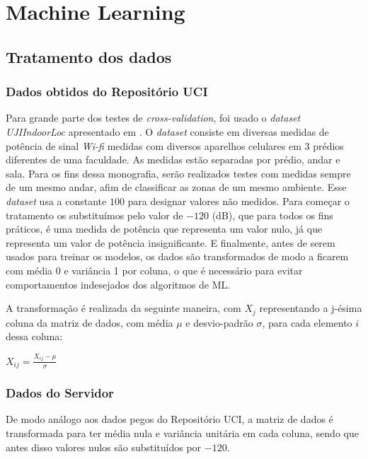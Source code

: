 \chapter{Machine Learning}\label{chp:ml}


\section{Tratamento dos dados}\label{sec:data1}

\subsection{Dados obtidos do Repositório UCI}
	Para grande parte dos testes de \textit{cross-validation}, foi usado o \textit{dataset}  \textit{UJIIndoorLoc} apresentado em \cite{uji}. O \textit{dataset} consiste em diversas medidas de potência de sinal \textit{Wi-fi} medidas com diversos aparelhos celulares em 3 prédios diferentes de uma faculdade. As medidas estão separadas por prédio, andar e sala. Para os fins dessa monografia, serão realizados testes com medidas sempre de um mesmo andar, afim de classificar as zonas de um mesmo ambiente.  Esse  \textit{dataset} usa a constante $100$ para designar valores não medidos. Para começar o tratamento os substituímos pelo valor de $-120$ (dB), que para todos os fins práticos, é uma medida de potência que representa um valor nulo, já que representa um valor de potência insignificante. E finalmente, antes de serem usados para treinar os modelos, os dados são transformados de modo a ficarem com média 0 e variância 1 por coluna, o que é necessário para evitar comportamentos indesejados dos algoritmos de ML.
	
A transformação é realizada da seguinte maneira, com $X_j$ representando a j-ésima coluna da matriz de dados, com média $\mu$ e desvio-padrão $\sigma$, para cada elemento $i$ dessa coluna:

\begin{center}
$X_{ij}=\frac{X_{ij}-\mu}{\sigma}$	
\end{center}

\subsection{Dados do Servidor}	

De modo análogo aos dados pegos do Repositório UCI, a matriz de dados é transformada para ter média nula e variância unitária em cada coluna, sendo que antes disso valores nulos são substituídos por $-120$.




